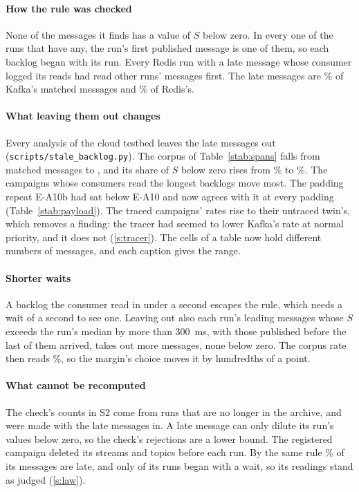 \documentclass[10pt,journal,onecolumn]{IEEEtran}
\newcommand{\kafka}{Kafka}
\newcommand{\redis}{Redis}
\begin{document}
\paragraph{How the rule was checked} None of the \backlogLate{} messages it finds has a value of
$S$ below zero. In every one of the \backlogRuns{} runs that have any, the run's first published
message is one of them, so each backlog began with its run. Every \redis{} run with a late message
whose consumer logged its reads had read other runs' messages first. The late messages are
\backlogKafkaLatePct\% of \kafka{}'s matched messages and \backlogRedisLatePct\% of \redis{}'s.

\paragraph{What leaving them out changes} Every analysis of the cloud testbed leaves the late
messages out (\texttt{scripts/stale\_backlog.py}). The corpus of Table~\ref{stab:spans} falls
from \backlogJoined{} matched messages to \spanEvents{}, and its share of $S$ below zero rises from
\backlogRateBeforePct\% to \spanNegAckPct\%. The campaigns whose consumers read the longest
backlogs move most. The padding repeat E-A10b had sat below E-A10 and now agrees with it at every
padding (Table~\ref{stab:payload}). The traced campaigns' rates rise to their untraced twin's,
which removes a finding: the tracer had seemed to lower \kafka{}'s rate at normal priority, and it
does not (\ref{s:tracer}). The cells of a table now hold different numbers of messages, and each
caption gives the range.

\paragraph{Shorter waits} A backlog the consumer read in under a second escapes the rule, which
needs a wait of a second to see one. Leaving out also each run's leading messages whose $S$
exceeds the run's median by more than $300$~ms, with those published before the last of them
arrived, takes out \backlogWideExtra{} more messages, none below zero. The corpus rate then reads
\backlogWideRatePct\%, so the margin's choice moves it by hundredths of a point.

\paragraph{What cannot be recomputed} The check's counts in S2 come from runs that are no
longer in the archive, and were made with the late messages in. A late message can only dilute its
run's values below zero, so the check's rejections are a lower bound. The registered campaign
deleted its streams and topics before each run. By the same rule \backlogAzureLatePct\% of its
messages are late, and only \backlogAzureStartRuns{} of its \backlogAzureRuns{} runs began with
a wait, so its readings stand as judged (\ref{s:law}).
\end{document}
